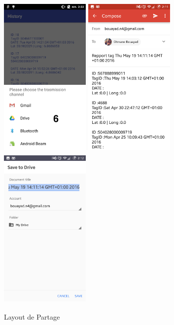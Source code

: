 \documentclass[11pt, a4paper, twoside]{book}
\begin{document}
 \begin{figure}[H]
\centering
\includegraphics[width=4.4cm,height=8cm]{sharemenu}
\includegraphics[width=4.4cm,height=8cm]{gmail}
\includegraphics[width=4.4cm,height=8cm]{drive}
\caption{Layout de Partage}
\end{figure}
\end{document}
